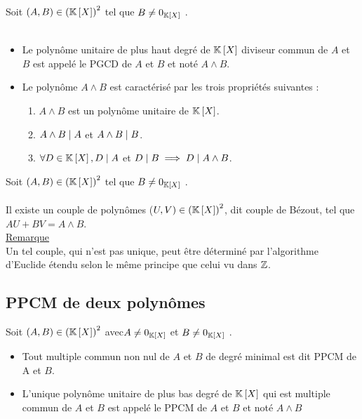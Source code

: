 \begin{defprop}
    Soit \((A, B) \in \left(\mathbb{K}\left[X\right]\right)^2\) tel que \(B\neq 0_{\mathbb{K}\left[X\right]}\) .\\~\\
    \begin{itemize}
        \item Le polynôme unitaire de plus haut degré de \(\mathbb{K}\left[X\right]\) diviseur commun de \(A\) et \(B\) est appelé le PGCD de \(A\) et \(B\) et noté \(A \wedge B\).
        \item Le polynôme \(A \wedge B\) est caractérisé par les trois propriétés suivantes :
        \begin{enumerate}
            \item \(A \wedge B\) est un polynôme unitaire de \(\mathbb{K}\left[X\right]\).
            \item \(A \wedge B \mid A\) et \(A \wedge B \mid B\).
            \item \(\forall  D \in \mathbb{K}\left[X\right] , D \mid A\) et \(D \mid B \implies D \mid A \wedge B\).
        \end{enumerate}
    \end{itemize}
\end{defprop}
\begin{defprop}
    Soit \((A, B) \in \left(\mathbb{K}\left[X\right]\right)^2\) tel que \(B\neq 0_{\mathbb{K}\left[X\right]}\) .\\~\\
    Il existe un couple de polynômes (\(U, V ) \in \left(\mathbb{K}\left[X\right]\right)^2\), dit couple de Bézout, tel que \(AU + BV = A \wedge B\).\\
    \underline{Remarque} \\
    Un tel couple, qui n’est pas unique, peut être déterminé par l’algorithme d’Euclide étendu selon le même principe que celui vu dans \(\mathbb{Z}\).
\end{defprop}
\subsection{PPCM de deux polynômes}
\begin{defprop}
    Soit \((A, B) \in \left(\mathbb{K}\left[X\right]\right)^2\) avec\( A\neq 0_{\mathbb{K}\left[X\right]}\)  et \(B\neq 0_{\mathbb{K}\left[X\right]}\) .
    \begin{itemize}
        \item Tout multiple commun non nul de \(A\) et \(B\) de degré minimal est dit PPCM de A\(\) et \(B\).
        \item L’unique polynôme unitaire de plus bas degré de \(\mathbb{K}\left[X\right]\) qui est multiple commun de \(A\) et \(B\) est appelé le PPCM de \(A\) et \(B\) et noté \(A \wedge B\)
    \end{itemize}
\end{defprop}
